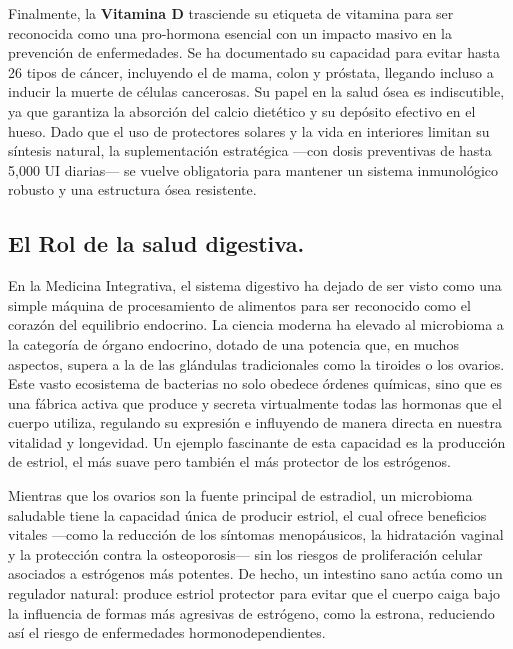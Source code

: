 \documentclass[
  spanish,
]{article}
\begin{document}
Finalmente, la \textbf{Vitamina D} trasciende su etiqueta de vitamina para ser reconocida como una pro-hormona esencial con un impacto masivo en la prevención de enfermedades. Se ha documentado su capacidad para evitar hasta 26 tipos de cáncer, incluyendo el de mama, colon y próstata, llegando incluso a inducir la muerte de células cancerosas. Su papel en la salud ósea es indiscutible, ya que garantiza la absorción del calcio dietético y su depósito efectivo en el hueso. Dado que el uso de protectores solares y la vida en interiores limitan su síntesis natural, la suplementación estratégica ---con dosis preventivas de hasta 5,000 UI diarias--- se vuelve obligatoria para mantener un sistema inmunológico robusto y una estructura ósea resistente.

\subsection{El Rol de la salud digestiva.}\label{el-rol-de-la-salud-digestiva.}

En la Medicina Integrativa, el sistema digestivo ha dejado de ser visto como una simple máquina de procesamiento de alimentos para ser reconocido como el corazón del equilibrio endocrino. La ciencia moderna ha elevado al microbioma a la categoría de órgano endocrino, dotado de una potencia que, en muchos aspectos, supera a la de las glándulas tradicionales como la tiroides o los ovarios. Este vasto ecosistema de bacterias no solo obedece órdenes químicas, sino que es una fábrica activa que produce y secreta virtualmente todas las hormonas que el cuerpo utiliza, regulando su expresión e influyendo de manera directa en nuestra vitalidad y longevidad.
Un ejemplo fascinante de esta capacidad es la producción de estriol, el más suave pero también el más protector de los estrógenos.

Mientras que los ovarios son la fuente principal de estradiol, un microbioma saludable tiene la capacidad única de producir estriol, el cual ofrece beneficios vitales ---como la reducción de los síntomas menopáusicos, la hidratación vaginal y la protección contra la osteoporosis--- sin los riesgos de proliferación celular asociados a estrógenos más potentes. De hecho, un intestino sano actúa como un regulador natural: produce estriol protector para evitar que el cuerpo caiga bajo la influencia de formas más agresivas de estrógeno, como la estrona, reduciendo así el riesgo de enfermedades hormonodependientes.
\end{document}
